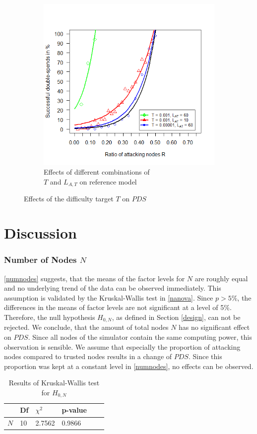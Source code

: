 \documentclass[a4paper,12pt,twoside]{report}
\begin{document}
\begin{figure}[hb!]
\begin{subfigure}{.5\textwidth}
  \includegraphics[width=\linewidth]{Experiments/Difficulty/diffrat.png}
  \caption{Effects of different combinations of \\ $T$ and $L_{A,T}$ on reference model}
  \label{diff:b}
\end{subfigure}
\caption{Effects of the difficulty target $T$ on $PDS$}
\label{diff}
\end{figure}

\section{Discussion}
\subsubsection{Number of Nodes $N$}
\autoref{numnodes} suggests, that the means of the factor levels for $N$ are roughly equal and no underlying trend of the data can be observed immediately. This assumption is validated by the Kruskal-Wallis test in \autoref{nanova}. Since $p > 5\%$, the differences in the means of factor levels are not significant at a level of 5\%. Therefore, the null hypothesis $H_{0,N}$, as defined in Section \ref{design}, can not be rejected. We conclude, that the amount of total nodes $N$ has no significant effect on $PDS$. Since all nodes of the simulator contain the same computing power, this observation is sensible. We assume that especially the proportion of attacking nodes compared to trusted nodes results in a change of $PDS$. Since this proportion was kept at a constant level in \autoref{numnodes}, no effects can be observed.
\begin{table}[ht]
\centering
\begin{tabular}{|l|l|l|l|l|l|} \hline
& Df & $\chi^{2}$ & p-value \\ \hline
$N$ & 10 &  2.7562 & 0.9866 \\ \hline
\end{tabular}
\caption{Results of Kruskal-Wallis test for $H_{0,N}$}
\label{nanova}
\end{table}
\end{document}
